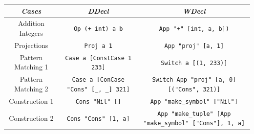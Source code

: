 \documentclass[a1,portrait]{a1poster}
\begin{document}
\begin{multicols}{2}

\begin{center}
\begin{tabular}{ |c|c|c| } 
 \toprule
 \textit{Cases} & \textit{DDecl} & \textit{WDecl} \\
 \midrule
 Addition Integers & \lstinline!Op (+ int) a b!  & \lstinline!App "+" [int, a, b])! \\
 \midrule
 Projections & \lstinline!Proj a 1! & \lstinline!App "proj" [a, 1]!                 \\
 \midrule
 Pattern Matching 1 & \lstinline!Case a [ConstCase 1 233]! & \lstinline!Switch a [(1, 233)]! \\
 \midrule
 Pattern Matching 2 & \lstinline!Case a [ConCase "Cons" [_, _] 321]! & \lstinline!Switch App "proj" [a, 0] [("Cons", 321)]! \\
 \midrule
 Construction 1 & \lstinline!Cons "Nil" []! & \lstinline!App "make_symbol" ["Nil"]! \\
 \midrule
 Construction 2 & \lstinline!Cons "Cons" [1, a]! & \lstinline!App "make_tuple" [App "make_symbol" ["Cons"], 1, a]! \\
 \bottomrule
\end{tabular}
\end{center}


\end{multicols}
\end{document}
